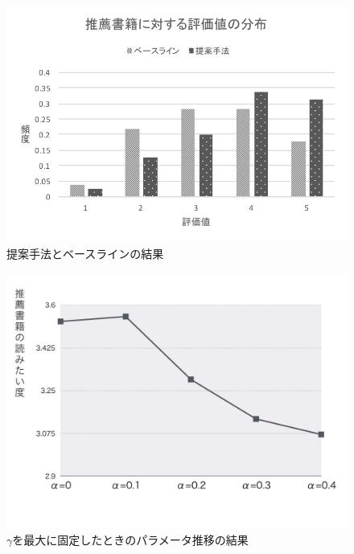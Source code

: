 \documentclass[a4paper,11pt,oneside,openany]{jsbook}
\begin{document}
\begin{figure}[htb]
	\begin{center} %
		\includegraphics [width =120mm] {figures/result_topic.pdf} %
	\end{center}
	\caption{提案手法とベースラインの結果} %
	\label{fig:result1} %
\end{figure}
\begin{figure}[htb]
	\begin{center} %
		\includegraphics [width = 120mm] {figures/res_gamma.jpeg} %
	\end{center}
	\caption{$\gamma$を最大に固定したときのパラメータ推移の結果} %
	\label{fig:result2} %
\end{figure}
\end{document}
